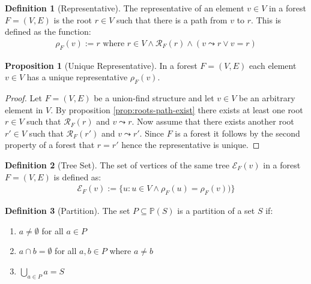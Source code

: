\documentclass[a4paper,12pt]{article}
\theoremstyle{definition}
\newtheorem{definition}{Definition}[section]
\newtheorem{proposition}{Proposition}[section]
\begin{document}
\begin{definition}[Representative]
    The representative of an element $v \in V$ in a forest $F = (V, E)$ is the
    root $r \in V$ such that there is a path from $v$ to $r$. This is defined as
    the function:
    \begin{align*}
        \rho_F(v) := r \text{ where } r \in V \land \mathcal{R}_F(r) \land (v \leadsto r \lor v = r)
    \end{align*}
\end{definition}

\begin{proposition}[Unique Representative]
    In a forest $F = (V, E)$ each element $v \in V$ has a unique
    representative $\rho_F(v)$.
\end{proposition}

\begin{proof}
    Let $F = (V, E)$ be a union-find structure and let $v \in V$ be an arbitrary
    element in $V$. By proposition \ref{prop:roots-path-exist} there exists at
    least one root $r \in V$ such that $\mathcal{R}_F(r)$ and $v \leadsto r$.
    Now assume that there exists another root $r' \in V$ such that $\mathcal{R}_F(r')$
    and $v \leadsto r'$. Since $F$ is a forest it follows by the second property
    of a forest that $r = r'$ hence the representative is unique.
\end{proof}

\begin{definition}[Tree Set]
    The set of vertices of the same tree $\mathcal{E}_F(v)$ in a
    forest $F = (V, E)$ is defined as:
    \begin{align*}
        \mathcal{E}_F(v) := \{u : u \in V \land \rho_F(u) = \rho_F(v))\}
    \end{align*}
\end{definition}

\begin{definition}[Partition]\label{def:partition}
    The set $P \subseteq \mathbb{P}(S)$ is a partition of a set $S$ if:
    \begin{enumerate}
        \item $a \neq \emptyset$ for all $a \in P$
        \item $a \cap b = \emptyset$ for all $a, b \in P$ where $a
        \neq b$
        \item $\bigcup_{a \in P} a = S$
    \end{enumerate}
\end{definition}
\end{document}

